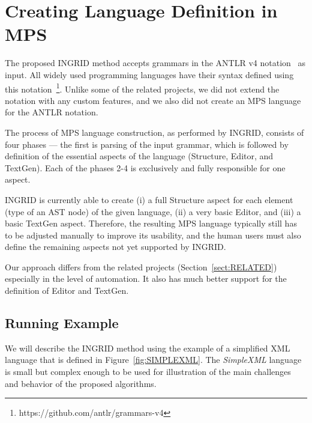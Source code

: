 \section{Creating Language Definition in MPS}
\label{sect:LANGDEF}

The proposed INGRID method accepts grammars in the ANTLR v4 notation~\cite{ref:ANTLRBOOK} as input.
All widely used programming languages have their syntax defined using this notation~\footnote{https://github.com/antlr/grammars-v4}.
Unlike some of the related projects, we did not extend the notation with any custom features, and we also did not create an MPS language for the ANTLR notation.

The process of MPS language construction, as performed by INGRID, consists of four phases --- the first is parsing of the input grammar, which is followed by definition of the essential aspects of the language (Structure, Editor, and TextGen).
Each of the phases 2-4 is exclusively and fully responsible for one aspect.

INGRID is currently able to create (i) a full Structure aspect for each element (type of an AST node) of the given language, (ii) a very basic Editor, and (iii) a basic TextGen aspect.
Therefore, the resulting MPS language typically still has to be adjusted manually to improve its usability, and the human users must also define the remaining aspects not yet supported by INGRID.

Our approach differs from the related projects (Section~\ref{sect:RELATED}) especially in the level of automation. It also has much better support for the definition of Editor and TextGen.

\subsection{Running Example}

We will describe the INGRID method using the example of a simplified XML language that is defined in Figure~\ref{fig:SIMPLEXML}.
The \emph{SimpleXML} language is small but complex enough to be used for illustration of the main challenges and behavior of the proposed algorithms.

